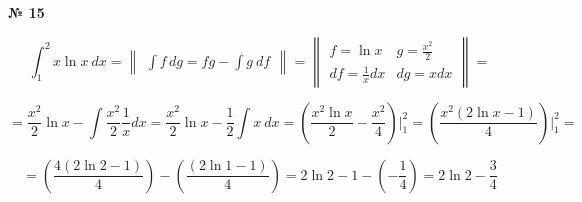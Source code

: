 \documentclass{article}
\begin{document}
\textbf{№ 15} 

$$ \int_{1}^{2} x\ln{x} \ dx 
= \begin{Vmatrix} \int f \,dg = fg - \int g \ df \end{Vmatrix} =
  \begin{Vmatrix} f = \ln{x} &  g = \frac{x^2}{2} \\
                 df = \frac{1}{x}dx  & dg = x dx \end{Vmatrix} = $$

$$ = \frac{x^2}{2}\ln{x} - \int \frac{x^2}{2} \frac{1}{x}dx
= \frac{x^2}{2}\ln{x} - \frac{1}{2}\int x \ dx
= \left( \frac{x^2\ln{x}}{2} - \frac{x^2}{4} \right) \bigg\vert_{1}^{2}
= \left( \frac{x^2(2\ln{x} - 1)}{4} \right) \bigg\vert_{1}^{2} 
= $$

$$ = \left( \frac{4(2\ln{2} - 1)}{4} \right) - \left( \frac{(2\ln{1} - 1)}{4} \right)
= 2\ln{2} - 1 - \left( -\frac{1}{4} \right)
= 2\ln{2} - \frac{3}{4}$$
\end{document}
